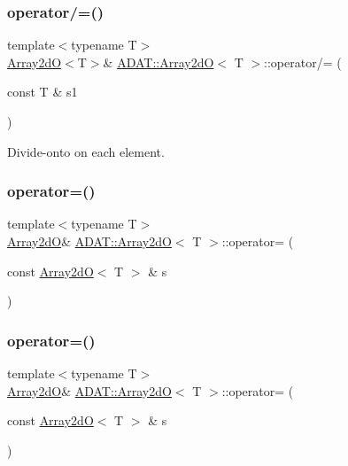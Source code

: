 \subsubsection{\texorpdfstring{operator/=()}{operator/=()}\hspace{0.1cm}{\footnotesize\ttfamily [4/4]}}
{\footnotesize\ttfamily template$<$typename T$>$ \\
\mbox{\hyperlink{classADAT_1_1Array2dO}{Array2dO}}$<$T$>$\& \mbox{\hyperlink{classADAT_1_1Array2dO}{A\+D\+A\+T\+::\+Array2dO}}$<$ T $>$\+::operator/= (\begin{DoxyParamCaption}\item[{const T \&}]{s1 }\end{DoxyParamCaption})\hspace{0.3cm}{\ttfamily [inline]}}



Divide-\/onto on each element. 

\mbox{\label{classADAT_1_1Array2dO_a258fcfecc226990cc40b36f1edb2f4d5}} 
\subsubsection{\texorpdfstring{operator=()}{operator=()}\hspace{0.1cm}{\footnotesize\ttfamily [1/4]}}
{\footnotesize\ttfamily template$<$typename T$>$ \\
\mbox{\hyperlink{classADAT_1_1Array2dO}{Array2dO}}\& \mbox{\hyperlink{classADAT_1_1Array2dO}{A\+D\+A\+T\+::\+Array2dO}}$<$ T $>$\+::operator= (\begin{DoxyParamCaption}\item[{const \mbox{\hyperlink{classADAT_1_1Array2dO}{Array2dO}}$<$ T $>$ \&}]{s }\end{DoxyParamCaption})\hspace{0.3cm}{\ttfamily [inline]}}

\mbox{\label{classADAT_1_1Array2dO_a258fcfecc226990cc40b36f1edb2f4d5}} 
\subsubsection{\texorpdfstring{operator=()}{operator=()}\hspace{0.1cm}{\footnotesize\ttfamily [2/4]}}
{\footnotesize\ttfamily template$<$typename T$>$ \\
\mbox{\hyperlink{classADAT_1_1Array2dO}{Array2dO}}\& \mbox{\hyperlink{classADAT_1_1Array2dO}{A\+D\+A\+T\+::\+Array2dO}}$<$ T $>$\+::operator= (\begin{DoxyParamCaption}\item[{const \mbox{\hyperlink{classADAT_1_1Array2dO}{Array2dO}}$<$ T $>$ \&}]{s }\end{DoxyParamCaption})\hspace{0.3cm}{\ttfamily [inline]}}

